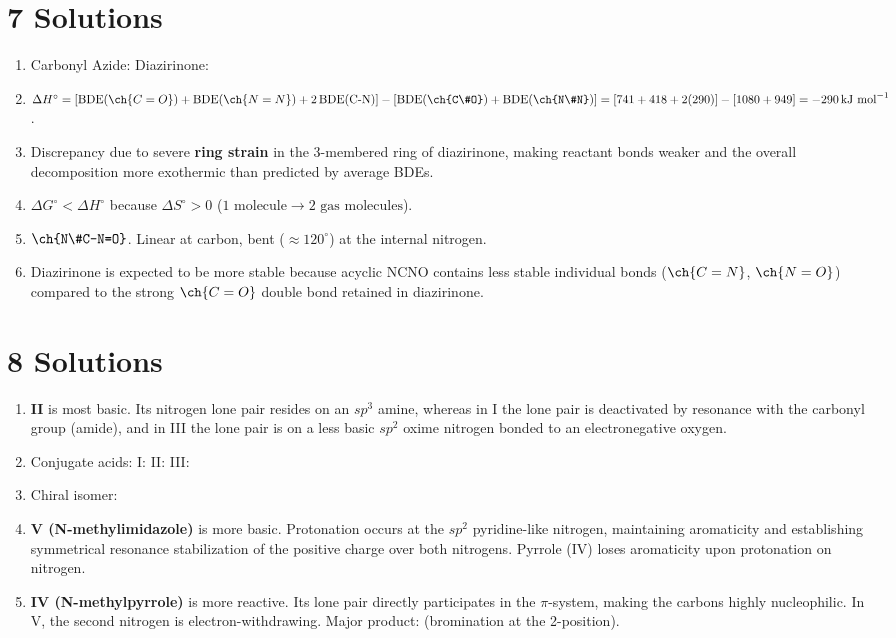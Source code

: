 \documentclass[11pt]{article}
\begin{document}
\section{7 Solutions}
\begin{enumerate}[label=\alph*.]
    \item Carbonyl Azide:  \qquad Diazirinone: 
    \item $\Delta H^{\circ} = [\text{BDE}(\ch{C=O}) + \text{BDE}(\ch{N=N}) + 2\,\text{BDE}(\text{C-N})] - [\text{BDE}(\ch{C\#O}) + \text{BDE}(\ch{N\#N})] = [741 + 418 + 2(290)] - [1080 + 949] = -290\,\text{kJ mol}^{-1}$.
    \item Discrepancy due to severe \textbf{ring strain} in the 3-membered ring of diazirinone, making reactant bonds weaker and the overall decomposition more exothermic than predicted by average BDEs.
    \item $\Delta G^{\circ} < \Delta H^{\circ}$ because $\Delta S^{\circ} > 0$ ($1 \text{ molecule} \rightarrow 2 \text{ gas molecules}$).
    \item $\ch{N\#C-N=O}$. Linear at carbon, bent ($\approx 120^\circ$) at the internal nitrogen.
    \item Diazirinone is expected to be more stable because acyclic NCNO contains less stable individual bonds ($\ch{C=N}$, $\ch{N=O}$) compared to the strong $\ch{C=O}$ double bond retained in diazirinone.
\end{enumerate}

\section{8 Solutions}
\begin{enumerate}[label=\alph*.]
    \item \textbf{II} is most basic. Its nitrogen lone pair resides on an $sp^3$ amine, whereas in I the lone pair is deactivated by resonance with the carbonyl group (amide), and in III the lone pair is on a less basic $sp^2$ oxime nitrogen bonded to an electronegative oxygen.
    \item Conjugate acids:
    I:  \quad
    II:  \quad
    III: 
    \item Chiral isomer: 
    \item \textbf{V (N-methylimidazole)} is more basic. Protonation occurs at the $sp^2$ pyridine-like nitrogen, maintaining aromaticity and establishing symmetrical resonance stabilization of the positive charge over both nitrogens. Pyrrole (IV) loses aromaticity upon protonation on nitrogen.
    \item \textbf{IV (N-methylpyrrole)} is more reactive. Its lone pair directly participates in the $\pi$-system, making the carbons highly nucleophilic. In V, the second nitrogen is electron-withdrawing. Major product:  (bromination at the 2-position).
\end{enumerate}
\end{document}
